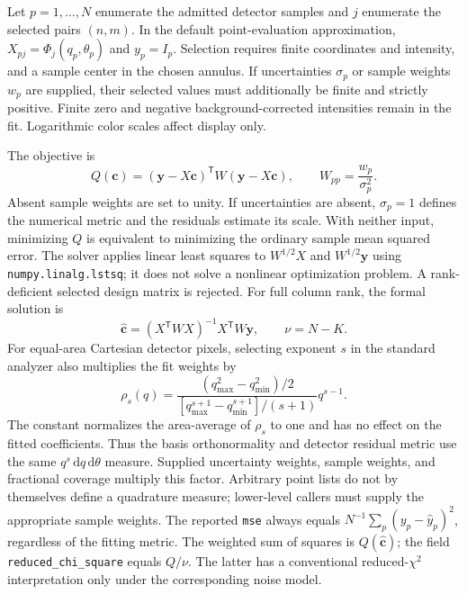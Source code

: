 \documentclass[aps,prb,preprint,onecolumn,notitlepage,amsmath,amssymb,
  superscriptaddress,floatfix]{revtex4-2}
\newcommand{\dd}{\,\mathrm{d}}
\newcommand{\trans}{\mathsf{T}}
\begin{document}
Let $p=1,\ldots,N$ enumerate the admitted detector samples and $j$ enumerate
the selected pairs $(n,m)$. In the default point-evaluation approximation,
$X_{pj}=\Phi_j(q_p,\theta_p)$ and $y_p=I_p$. Selection requires finite
coordinates and intensity, and a sample center in the chosen annulus.
If uncertainties $\sigma_p$ or sample weights $w_p$ are supplied, their
selected values must additionally be finite and strictly positive.
Finite zero and negative background-corrected intensities remain in the
fit. Logarithmic color scales affect display only.

The objective is
\begin{equation}
 Q(\bm c)=(\bm y-X\bm c)^{\trans}W(\bm y-X\bm c),\qquad
 W_{pp}=\frac{w_p}{\sigma_p^2}.
 \label{eq:wls}
\end{equation}
Absent sample weights are set to unity. If uncertainties are absent,
$\sigma_p=1$ defines the numerical metric and the residuals estimate its
scale. With neither input, minimizing $Q$ is equivalent to minimizing the
ordinary sample mean squared error. The solver applies linear least squares
to $W^{1/2}X$ and $W^{1/2}\bm y$ using \texttt{numpy.linalg.lstsq}; it
does not solve a nonlinear optimization problem. A rank-deficient selected
design matrix is rejected. For full column rank, the formal solution is
\begin{equation}
 \widehat{\bm c}=(X^{\trans}WX)^{-1}X^{\trans}W\bm y,
 \qquad \nu=N-K.
 \label{eq:solution}
\end{equation}
For equal-area Cartesian detector pixels, selecting exponent $s$ in the
standard analyzer also multiplies the fit weights by
\begin{equation}
 \rho_s(q)=
 \frac{(q_{\max}^2-q_{\min}^2)/2}
 {[q_{\max}^{s+1}-q_{\min}^{s+1}]/(s+1)}q^{s-1}.
 \label{eq:radial-fit-weight}
\end{equation}
The constant normalizes the area-average of $\rho_s$ to one and has no effect
on the fitted coefficients. Thus the basis orthonormality and detector
residual metric use the same $q^s\dd q\dd\theta$ measure. Supplied
uncertainty weights, sample weights, and fractional coverage multiply this
factor. Arbitrary point lists do not by themselves define a quadrature
measure; lower-level callers must supply the appropriate sample weights.
The reported \texttt{mse} always equals
$N^{-1}\sum_p(y_p-\widehat y_p)^2$, regardless of the fitting metric.
The weighted sum of squares is $Q(\widehat{\bm c})$; the field
\texttt{reduced\_chi\_square} equals $Q/\nu$. The latter has a conventional
reduced-$\chi^2$ interpretation only under the corresponding noise model.
\end{document}
